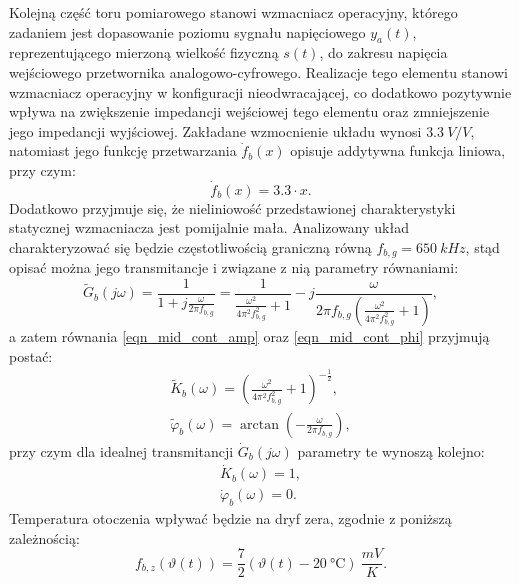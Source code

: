 Kolejną część toru pomiarowego stanowi wzmacniacz operacyjny, którego zadaniem jest dopasowanie poziomu sygnału napięciowego $y_{a}(t)$, reprezentującego mierzoną wielkość fizyczną $s(t)$, do zakresu napięcia wejściowego przetwornika analogowo-cyfrowego. Realizacje tego elementu stanowi wzmacniacz operacyjny w konfiguracji nieodwracającej, co dodatkowo pozytywnie wpływa na zwiększenie impedancji wejściowej tego elementu oraz zmniejszenie jego impedancji wyjściowej. Zakładane wzmocnienie układu wynosi $\qty{3.3}{V \per V}$, natomiast jego funkcję przetwarzania $\dot{f}_{b}(x)$ opisuje addytywna funkcja liniowa, przy czym:
\begin{equation}
\dot{f}_{b}(x) = 3.3 \cdot x \label{eqn_sym_partb_function}.
\end{equation}
Dodatkowo przyjmuje się, że nieliniowość przedstawionej charakterystyki statycznej wzmacniacza jest pomijalnie mała. Analizowany układ charakteryzować się będzie częstotliwością graniczną równą $f_{b,g} = \qty{650}{kHz}$, stąd opisać można jego transmitancje i związane z nią parametry równaniami:
\begin{equation}
\tilde{G}_{b}(j\omega) = \frac{1}{1 + j \frac{\omega}{2 \pi f_{b,g}}} = \frac{1}{\frac{\omega^{2}}{4 \pi^{2} f_{b,g}^{2}} + 1} - j \frac{\omega}{2 \pi f_{b,g} \left( \frac{\omega^{2}}{4 \pi^{2} f_{b,g}^{2}} + 1 \right) } \label{eqn_sym_partb_trans},
\end{equation}
a zatem równania \eqref{eqn_mid_cont_amp} oraz \eqref{eqn_mid_cont_phi} przyjmują postać:
\begin{gather}
\tilde{K}_{b}(\omega) = \left( \frac{\omega^{2}}{4 \pi^{2} f_{b,g}^{2}} + 1 \right)^{-\frac{1}{2}} \label{eqn_sym_partb_amp_real}, \\
\tilde{\varphi}_{b}(\omega) = \arctan \left( -\frac{\omega}{2 \pi f_{b,g}} \right) \label{eqn_sym_partb_phi_real},
\end{gather}
przy czym dla idealnej transmitancji $\dot{G}_{b}(j\omega)$ parametry te wynoszą kolejno:
\begin{gather}
\dot{K}_{b}(\omega) = 1 \label{eqn_sym_partb_amp_ideal}, \\
\dot{\varphi}_{b}(\omega) = 0  \label{eqn_sym_partb_phi_ideal}.
\end{gather}
Temperatura otoczenia wpływać będzie na dryf zera, zgodnie z poniższą zależnością:
\begin{equation}
f_{b,z}(\vartheta(t)) = \frac{7}{2} (\vartheta(t) - \qty{20}{\degreeCelsius}) ~\unit{\frac{mV}{K}} \label{eqn_sym_partb_temp_err}.
\end{equation}

